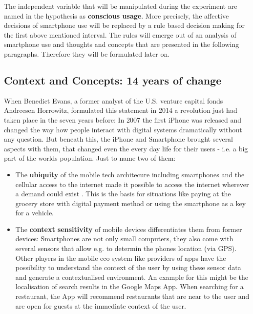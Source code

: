 \documentclass[11pt,letterpaper]{article}
\begin{document}
The independent variable that will be manipulated during the experiment are named in the hypothesis as \textbf{conscious usage}. More precisely, the affective decisions of smartphone use will be replaced by a rule based decision making for the first above mentioned interval. The rules will emerge out of an analysis of smartphone use and thoughts and concepts that are presented in the following paragraphs. Therefore they will be formulated later on.

\subsection*{Context and Concepts: 14 years of change}
\begin{center}
 \autocite[][]{evans14}
 \end{center}
When Benedict Evans, a former analyst of the U.S. venture capital fonds Andreesen Horrowitz, formulated this statement in 2014 a revolution just had taken place in the seven years before: In 2007 the first iPhone was released and changed the way how people interact with digital systems dramatically without any question. But beneath this, the iPhone and Smartphone brought several aspects with them, that changed even the every day life for their users - i.e. a big part of the worlds population. Just to name two of them: 
\begin{itemize}
\item 
The \textbf{ubiquity} of the mobile tech architecure including smartphones and the cellular access to the internet made it possible to access the internet wherever a demand could exist \autocite[][p.1]{okazaki13}. This is the basis for situations like paying at the grocery store with digital payment method or using the smartphone as a key for a vehicle.
\item
The \textbf{context sensitivity} of mobile devices differentiates them from former devices: Smartphones are not only small computers, they also come with several sensors that allow e.g. to determin the phones location (via GPS)\autocite[][p.1]{minch04}. Other players in the mobile eco system like providers of apps have the possibility to understand the context of the user by using these sensor data and generate a contextualised environment. An example for this might be the localisation of search results in the Google Maps App. When searching for a restaurant, the App will recommend restaurants that are near to the user and are open for guests at the immediate context of the user.
\end{itemize}
\end{document}
